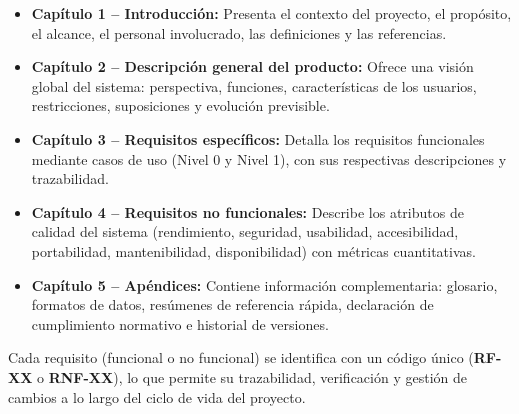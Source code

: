 \begin{itemize}
  \item \textbf{Capítulo 1 -- Introducción:} Presenta el contexto del proyecto, el propósito, el alcance, el personal involucrado, las definiciones y las referencias.
  \item \textbf{Capítulo 2 -- Descripción general del producto:} Ofrece una visión global del sistema: perspectiva, funciones, características de los usuarios, restricciones, suposiciones y evolución previsible.
  \item \textbf{Capítulo 3 -- Requisitos específicos:} Detalla los requisitos funcionales mediante casos de uso (Nivel 0 y Nivel 1), con sus respectivas descripciones y trazabilidad.
  \item \textbf{Capítulo 4 -- Requisitos no funcionales:} Describe los atributos de calidad del sistema (rendimiento, seguridad, usabilidad, accesibilidad, portabilidad, mantenibilidad, disponibilidad) con métricas cuantitativas.
  \item \textbf{Capítulo 5 -- Apéndices:} Contiene información complementaria: glosario, formatos de datos, resúmenes de referencia rápida, declaración de cumplimiento normativo e historial de versiones.
\end{itemize}

Cada requisito (funcional o no funcional) se identifica con un código único (\textbf{RF-XX} o \textbf{RNF-XX}), lo que permite su trazabilidad, verificación y gestión de cambios a lo largo del ciclo de vida del proyecto.